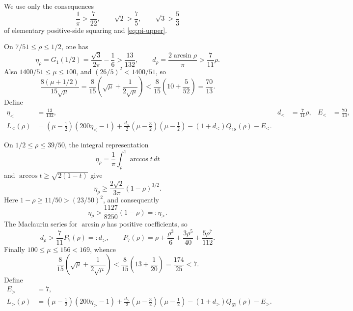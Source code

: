 \documentclass[11pt]{article}
\begin{document}
We use only the consequences
\[
 \frac1\pi>\frac7{22},
 \qquad
 \sqrt2>\frac75,
 \qquad
 \sqrt3>\frac53
\]
of elementary positive-side squaring and \eqref{eq:pi-upper}.

On \(7/51\leq\rho\leq1/2\), one has
\[
 \eta_\rho=G_1(1/2)
 =\frac{\sqrt3}{2\pi}-\frac16
 >\frac{13}{132},
 \qquad
 d_\rho=\frac{2\arcsin\rho}{\pi}>\frac7{11}\rho.
\]
Also \(1400/51\leq\mu\leq100\), and
\((26/5)^2<1400/51\), so
\begin{equation}
 \frac{8(\mu+1/2)}{15\sqrt\mu}
 =\frac8{15}\left(\sqrt\mu+\frac1{2\sqrt\mu}\right)
 <\frac8{15}\left(10+\frac5{52}\right)
 =\frac{70}{13}.
 \label{eq:E-low}
\end{equation}
Define
\begin{equation}
\begin{aligned}
 \eta_<&=\frac{13}{132},
 &d_<&=\frac7{11}\rho,
 &E_<&=\frac{70}{13},\\
 L_< (\rho)
 &=(\mu-\tfrac12)(200\eta_<-1)
 +\frac{d_<}{2}(\mu-\tfrac32)(\mu-\tfrac12)
 -(1+d_<)Q_{18}(\rho)-E_<.
\end{aligned}
\label{eq:L-low}
\end{equation}

On \(1/2\leq\rho\leq39/50\), the integral representation
\[
 \eta_\rho=\frac1\pi\int_\rho^1\arccos t\,dt
\]
and \(\arccos t\geq\sqrt{2(1-t)}\) give
\[
 \eta_\rho\geq\frac{2\sqrt2}{3\pi}(1-\rho)^{3/2}.
\]
Here \(1-\rho\geq11/50>(23/50)^2\), and consequently
\begin{equation}
 \eta_\rho>\frac{1127}{8250}(1-\rho)=:\eta_>.
 \label{eq:eta-high}
\end{equation}
The Maclaurin series for \(\arcsin\rho\) has positive coefficients, so
\begin{equation}
 d_\rho>\frac7{11}P_7(\rho)=:d_>,
 \qquad
 P_7(\rho)=\rho+\frac{\rho^3}{6}
 +\frac{3\rho^5}{40}+\frac{5\rho^7}{112}.
 \label{eq:d-high}
\end{equation}
Finally \(100\leq\mu\leq156<169\), whence
\begin{equation}
 \frac8{15}\left(\sqrt\mu+\frac1{2\sqrt\mu}\right)
 <\frac8{15}\left(13+\frac1{20}\right)
 =\frac{174}{25}<7.
 \label{eq:E-high}
\end{equation}
Define
\begin{equation}
\begin{aligned}
 E_>&=7,\\
 L_>(\rho)
 &=(\mu-\tfrac12)(200\eta_>-1)
 +\frac{d_>}{2}(\mu-\tfrac32)(\mu-\tfrac12)
 -(1+d_>)Q_{67}(\rho)-E_>.
\end{aligned}
\label{eq:L-high}
\end{equation}
\end{document}
